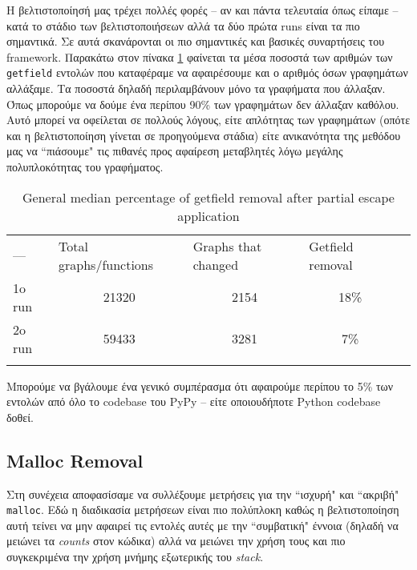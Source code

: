 Η βελτιστοποίησή μας τρέχει πολλές φορές – αν και πάντα τελευταία όπως είπαμε –
κατά το στάδιο των βελτιστοποιήσεων αλλά τα δύο πρώτα runs είναι τα πιο
σημαντικά. Σε αυτά σκανάρονται οι πιο σημαντικές και βασικές συναρτήσεις του
framework. Παρακάτω στον πίνακα \ref{table-getfield} φαίνεται τα μέσα ποσοστά
των αριθμών των \texttt{getfield} εντολών που καταφέραμε να αφαιρέσουμε και ο
αριθμός όσων γραφημάτων αλλάξαμε. Τα ποσοστά δηλαδή περιλαμβάνουν μόνο τα
γραφήματα που άλλαξαν. Όπως μπορούμε να δούμε ένα περίπου 90\% των γραφημάτων
δεν άλλαξαν καθόλου. Αυτό μπορεί να οφείλεται σε πολλούς λόγους, είτε απλότητας
των γραφημάτων (οπότε και η βελτιστοποίηση γίνεται σε προηγούμενα στάδια) είτε
ανικανότητα της μεθόδου μας να ``πιάσουμε" τις πιθανές προς αφαίρεση μεταβλητές
λόγω μεγάλης πολυπλοκότητας του γραφήματος.

\begin{table}[]
\centering
\caption{General median percentage of getfield removal after partial escape application}
\label{table-getfield}
\begin{tabular}{lllll}
–– & \cellcolor[HTML]{C0C0C0}Total graphs/functions &
\cellcolor[HTML]{C0C0C0}Graphs that changed & \cellcolor[HTML]{C0C0C0}Getfield removal &  \\
\cellcolor[HTML]{C0C0C0}1o run & \multicolumn{1}{c}{21320} & \multicolumn{1}{c}{2154} & \multicolumn{1}{c}{18\%} &  \\
\cellcolor[HTML]{C0C0C0}2o run & \multicolumn{1}{c}{59433} & \multicolumn{1}{c}{3281} & \multicolumn{1}{c}{7\%} &  \\
 &  &  &  & 
\end{tabular}
\end{table}

Μπορούμε να βγάλουμε ένα γενικό συμπέρασμα ότι αφαιρούμε περίπου το 5\% των
εντολών από όλο το codebase του PyPy – είτε οποιουδήποτε Python codebase δοθεί.

\subsection{Malloc Removal}

Στη συνέχεια αποφασίσαμε να συλλέξουμε μετρήσεις για την ``ισχυρή" και ``ακριβή"
\texttt{malloc}. Εδώ η διαδικασία μετρήσεων είναι πιο πολύπλοκη καθώς η
βελτιστοποίηση αυτή τείνει να μην αφαιρεί τις εντολές αυτές με την ``συμβατική"
έννοια (δηλαδή να μειώνει τα \textit{counts} στον κώδικα) αλλά να μειώνει την
χρήση τους και πιο συγκεκριμένα την χρήση μνήμης εξωτερικής του \textit{stack}.

